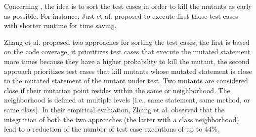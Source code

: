 Concerning , the idea is to sort the test cases in order to kill the mutants as early as possible. For instance, Just et al. \cite{just2012using} proposed to execute first those test cases with shorter runtime for time saving.


Zhang et al. \cite{zhang2013faster} proposed two approaches for sorting the test cases; the first is based on the code coverage, it prioritizes test cases that execute the mutated statement more times because they have a higher probability to kill the mutant, 
the second approach prioritizes test cases that kill mutants whose mutated statement is close to the mutated statement of the mutant under test. Two mutants are considered close if their mutation point resides within the same or neighborhood. The neighborhood is defined at multiple levels (i.e., same statement, same method, or same class).
In their empirical evaluation, Zhang et al. observed that the integration of both the two approaches (the latter with a class neighborhood) lead to a reduction of the number of test case executions of up to 44\%.



